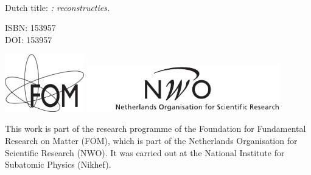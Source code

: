 \thispagestyle{empty}

\begin{center}

\vspace*{2cm}

\textlarger[3]{\hisparc}
\\[1em]
\end{center}

\clearpage

\vspace*{\fill}

\noindent
Dutch title: \emph{\hisparc: reconstructies.}

\vspace{1cm}

\noindent
ISBN: 153957 \\
DOI: 153957

\vspace{3cm}

\includegraphics[height=2.5cm]{figures/logo_FOM_zw}
\hfill
\includegraphics[height=2cm]{figures/logo_NWO_zw}

\vspace{.5cm}

\noindent
This work is part of the research programme of the Foundation for
Fundamental Research on Matter (FOM), which is part of the Netherlands
Organisation for Scientific Research (NWO).  It was carried out at the
National Institute for Subatomic Physics (Nikhef).



\cleardoublepage
\thispagestyle{empty}

